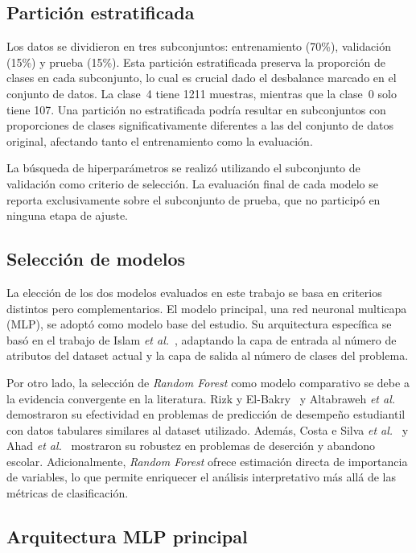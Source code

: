 \documentclass[conference]{IEEEtran}
\begin{document}
\subsection{Partición estratificada}

Los datos se dividieron en tres subconjuntos: entrenamiento (70\%), validación (15\%) y prueba (15\%). Esta partición estratificada preserva la proporción de clases en cada subconjunto, lo cual es crucial dado el desbalance marcado en el conjunto de datos. La clase~4 tiene 1211 muestras, mientras que la clase~0 solo tiene 107. Una partición no estratificada podría resultar en subconjuntos con proporciones de clases significativamente diferentes a las del conjunto de datos original, afectando tanto el entrenamiento como la evaluación.

La búsqueda de hiperparámetros se realizó utilizando el subconjunto de validación como criterio de selección. La evaluación final de cada modelo se reporta exclusivamente sobre el subconjunto de prueba, que no participó en ninguna etapa de ajuste.

\subsection{Selección de modelos}

La elección de los dos modelos evaluados en este trabajo se basa en criterios distintos pero complementarios. El modelo principal, una red neuronal multicapa (MLP), se adoptó como modelo base del estudio. Su arquitectura específica se basó en el trabajo de Islam \textit{et al.}~\cite{ieeeaccess}, adaptando la capa de entrada al número de atributos del dataset actual y la capa de salida al número de clases del problema.

Por otro lado, la selección de \textit{Random Forest} como modelo comparativo se debe a la evidencia convergente en la literatura. Rizk y El-Bakry~\cite{rf_algorithms} y Altabraweh \textit{et al.}~\cite{rf_advising} demostraron su efectividad en problemas de predicción de desempeño estudiantil con datos tabulares similares al dataset utilizado. Además, Costa e Silva \textit{et al.}~\cite{rf_dropout_review} y Ahad \textit{et al.}~\cite{rf_mooc} mostraron su robustez en problemas de deserción y abandono escolar. Adicionalmente, \textit{Random Forest} ofrece estimación directa de importancia de variables, lo que permite enriquecer el análisis interpretativo más allá de las métricas de clasificación.

\subsection{Arquitectura MLP principal}
\end{document}
